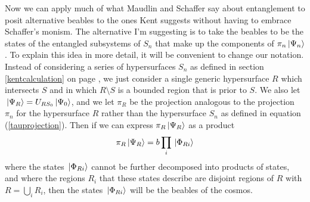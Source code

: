Now we can apply much of what Maudlin and Schaffer say about entanglement to posit alternative beables to the ones Kent suggests without having to embrace Schaffer's monism. The alternative I'm suggesting is to take  the beables to be the states of the entangled subsystems of $S_n$ that make up the components of $\pi_n\ket*{\Psi_n}$. To explain this idea in more detail, it will be convenient to change our notation. Instead of considering a series of hypersurfaces $S_n$ as defined in section \ref{kentcalculation} on page \pageref{siydef}, we just consider a single generic hypersurface $R$ %
%
which intersects $S$ and in which $R\setminus S$ is a bounded region that is prior to $S$. We also let $\ket*{\Psi_R}=U_{RS_0}\ket*{\Psi_0}$, %
%
and we let $\pi_R$ %
%
be the projection analogous to the projection  $\pi_n$ for the hypersurface $R$ rather than the hypersurface $S_n$ as defined in equation (\ref{tauprojection}). Then if we can express $\pi_R\ket*{\Psi_R}$ as a product 
\begin{equation}\label{beablesprod}
\pi_R\ket*{\Psi_R}=b\prod_i \ket*{\Phi_{Ri}}
\end{equation}%
%
where the states $\ket*{\Phi_{Ri}}$ cannot be further decomposed into products of states, and where the regions $R_{i}$ %
%
that these states describe are disjoint regions of $R$ with $R=\bigcup_i R_{i}$, then the states $\ket*{\Phi_{Ri}}$ will be the beables of the cosmos.


